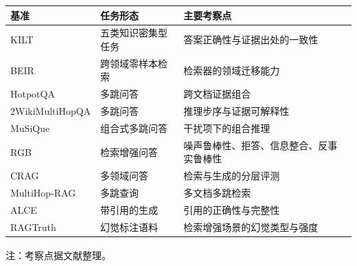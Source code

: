 \documentclass[10.5pt,compsoc,UTF8]{CjC}
\theoremstyle{mystyle}
\newcommand{\upcite}[1]{\textsuperscript{\cite{#1}}}
\begin{document}
\renewcommand{\arraystretch}{1.2}
\begin{table}[H]
\vspace {-2.5mm}
\begin{center}
\begin{tabular}{p{26mm}p{34mm}p{88mm}}
\toprule
基准 & 任务形态 & 主要考察点 \\
\hline
KILT & 五类知识密集型任务 & 答案正确性与证据出处的一致性 \\
BEIR & 跨领域零样本检索 & 检索器的领域迁移能力 \\
HotpotQA & 多跳问答 & 跨文档证据组合 \\
2WikiMultiHopQA & 多跳问答 & 推理步序与证据可解释性 \\
MuSiQue & 组合式多跳问答 & 干扰项下的组合推理 \\
RGB & 检索增强问答 & 噪声鲁棒性、拒答、信息整合、反事实鲁棒性 \\
CRAG & 多领域问答 & 检索与生成的分层评测 \\
MultiHop-RAG & 多跳查询 & 多文档多跳检索 \\
ALCE & 带引用的生成 & 引用的正确性与完整性 \\
RAGTruth & 幻觉标注语料 & 检索增强场景的幻觉类型与强度 \\
\bottomrule
\end{tabular}
\label{tab2}
\end{center}
\vspace{-1mm}
{\centering 注：考察点据文献\upcite{petroni2021kilt,thakur2021beir,yang2018hotpotqa,ho2020constructing,trivedi2022musique,chen2024benchmarking,yang2024crag,tang2024multihop,gao2023enabling,niu2023ragtruth}整理。}
\end{table}
\end{document}
